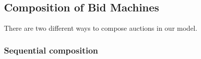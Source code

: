 
\subsection{Composition of Bid Machines}
There are two different ways to compose auctions in our model.

\subsubsection{Sequential composition}

